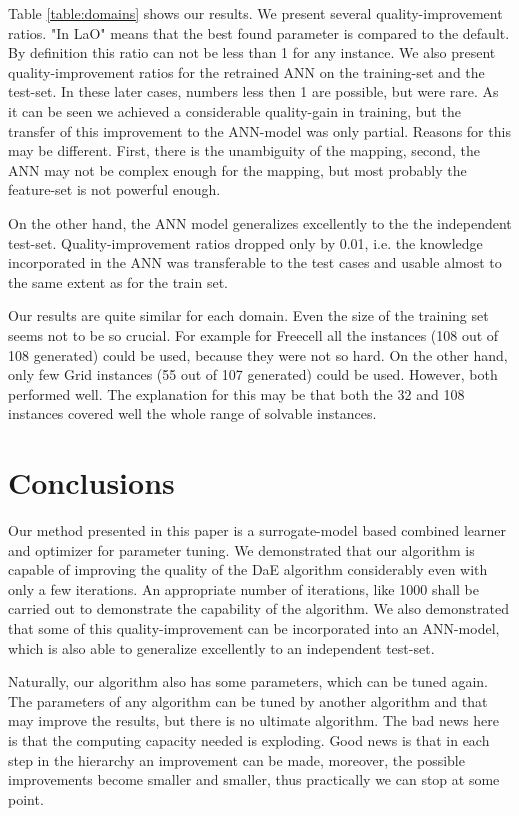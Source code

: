 \documentclass{acm_proc_article-sp}
\begin{document}
Table \ref{table:domains} shows our results. We present several quality-improvement ratios. "In LaO" means that the best found parameter is compared to the default. By definition this ratio can not be less than 1 for any instance. We also present quality-improvement ratios for the retrained ANN on the training-set and the test-set. In these later cases, numbers less then 1 are possible, but were rare. As it can be seen we achieved a considerable quality-gain in training, but the transfer of this improvement to the ANN-model was only partial. Reasons for this may be different. First, there is the unambiguity of the mapping, second, the ANN may not be complex enough for the mapping, but most probably the feature-set is not powerful enough. 

On the other hand, the ANN model generalizes excellently to the the independent test-set. Quality-improvement ratios dropped only by 0.01, i.e. the knowledge incorporated in the ANN was transferable to the test cases and usable almost to the same extent as for the train set.

Our results are quite similar for each domain. Even the size of the training set seems not to be so crucial. For example for Freecell all the instances (108 out of 108 generated) could be used, because they were not so hard. On the other hand, only few  Grid instances (55 out of 107 generated) could be used. However, both performed well. The explanation for this may be that both the 32 and 108 instances covered well the whole range of solvable instances.

\section{Conclusions}
\label{section:conclusions}

Our method presented in this paper is a surrogate-model based combined learner and optimizer for parameter tuning. We demonstrated that our algorithm is capable of improving the quality of the DaE algorithm considerably even with only a few iterations. An appropriate number of iterations, like 1000 shall be carried out to demonstrate the capability of the algorithm. We also demonstrated that some of this quality-improvement can be incorporated into an ANN-model, which is also able to generalize excellently to an independent test-set.

Naturally, our algorithm also has some parameters, which can be tuned again. The parameters of any algorithm can be tuned by another algorithm and that may improve the results, but there is no ultimate algorithm. The bad news here is that the computing capacity needed is exploding. Good news is that in each step in the hierarchy an improvement can be made, moreover, the possible improvements become smaller and smaller, thus practically we can stop at some point. 
\end{document}

